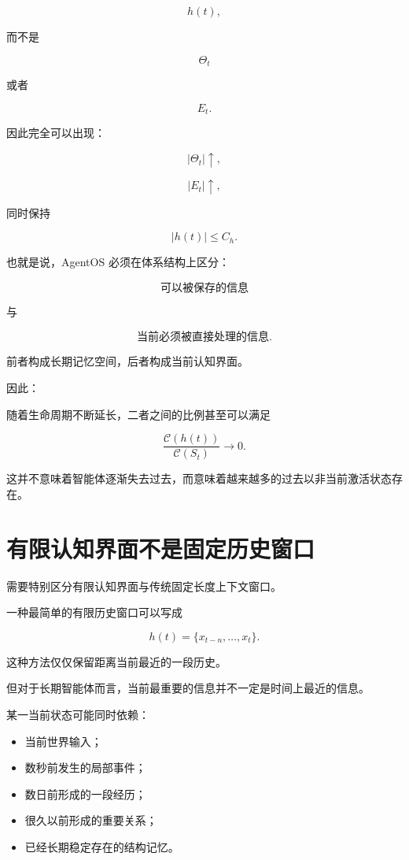 \[
h(t),
\]

而不是

\[
\Theta_t
\]

或者

\[
E_t.
\]

因此完全可以出现：

\[
|\Theta_t|
\uparrow,
\]

\[
|E_t|
\uparrow,
\]

同时保持

\[
|h(t)|
\leq
C_h.
\]

也就是说，AgentOS 必须在体系结构上区分：

\[
\text{可以被保存的信息}
\]

与

\[
\text{当前必须被直接处理的信息}.
\]

前者构成长期记忆空间，后者构成当前认知界面。

因此：

\begin{statementbox}
\centering
{}
\end{statementbox}

随着生命周期不断延长，二者之间的比例甚至可以满足

\[
\frac{\mathcal{C}(h(t))}
{\mathcal{C}(S_t)}
\rightarrow
0.
\]

这并不意味着智能体逐渐失去过去，而意味着越来越多的过去以非当前激活状态存在。


\section{有限认知界面不是固定历史窗口}

需要特别区分有限认知界面与传统固定长度上下文窗口。

一种最简单的有限历史窗口可以写成

\[
h(t)
=
\{x_{t-n},\ldots,x_t\}.
\]

这种方法仅仅保留距离当前最近的一段历史。

但对于长期智能体而言，当前最重要的信息并不一定是时间上最近的信息。

某一当前状态可能同时依赖：

\begin{itemize}
    \item 当前世界输入；
    \item 数秒前发生的局部事件；
    \item 数日前形成的一段经历；
    \item 很久以前形成的重要关系；
    \item 已经长期稳定存在的结构记忆。
\end{itemize}

